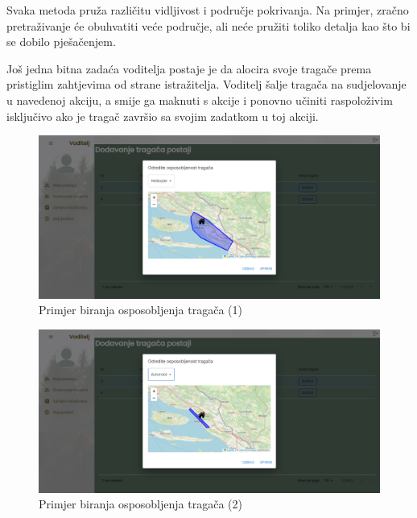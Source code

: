 		Svaka metoda pruža različitu vidljivost i područje pokrivanja. Na primjer, zračno pretraživanje će obuhvatiti veće područje, ali neće pružiti toliko detalja kao što bi se dobilo pješačenjem.
		
		Još jedna bitna zadaća voditelja postaje je da alocira svoje tragače prema pristiglim zahtjevima od strane istražitelja. Voditelj šalje tragača na sudjelovanje u navedenoj akciju, a smije ga maknuti s akcije i ponovno učiniti raspoloživim isključivo ako je tragač završio sa svojim zadatkom u toj akciji.
		
	\begin{figure}[H]
			\includegraphics[scale=0.7]{slike/pr_biranja_osposobljenja.PNG} %
			\centering
			\caption{Primjer biranja osposobljenja tragača (1)}
			\label{fig:promjene}
		\end{figure}
		
		\begin{figure}[H]
			\includegraphics[scale=0.7]{slike/pr_biranja_osposobljenja2.PNG} %
			\centering
			\caption{Primjer biranja osposobljenja tragača (2)}
			\label{fig:promjene}
		\end{figure}
		
